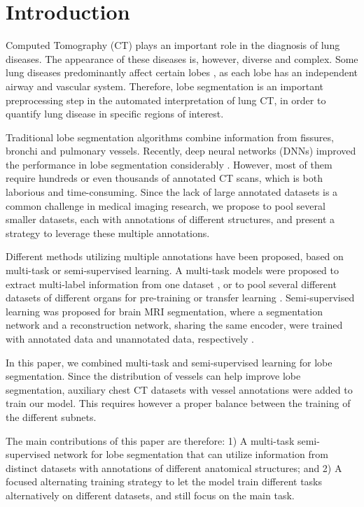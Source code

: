 \section{Introduction}
Computed Tomography (CT) plays an important role in the diagnosis of lung diseases. The appearance of these diseases is, however, diverse and complex. Some lung diseases predominantly affect certain lobes \cite{park2020fully}, as each lobe has an independent airway and vascular system. Therefore, lobe segmentation is an important preprocessing step in the automated interpretation of lung CT, in order to quantify lung disease in specific regions of interest.

Traditional lobe segmentation algorithms \cite{lassen2012automatic} combine information from fissures, bronchi and pulmonary vessels. Recently, deep neural networks (DNNs) improved the performance in lobe segmentation considerably \cite{gerard2018fissurenet, george2017pathological}. However, most of them require hundreds \cite{george2017pathological}or even thousands \cite{gerard2018fissurenet} of annotated CT scans, which is both laborious and time-consuming. Since the lack of large annotated datasets is a common challenge in medical imaging research, we propose to pool several smaller datasets, each with annotations of different structures, and present a strategy to leverage these multiple annotations.

Different methods utilizing multiple annotations have been proposed, based on multi-task or semi-supervised learning. A multi-task models were proposed to extract multi-label information from one dataset \cite{ferreira2018end}, or to pool several different datasets of different organs for pre-training or transfer learning \cite{chen2019med3d}. Semi-supervised learning was proposed for brain MRI segmentation, where a segmentation network and a reconstruction network, sharing the same encoder, were trained with annotated data and unannotated data, respectively \cite{chen2019multi}. 

In this paper, we combined multi-task and semi-supervised learning for lobe segmentation. Since the distribution of vessels can help improve lobe segmentation, auxiliary chest CT datasets with vessel annotations were added to train our model. This requires however a proper balance between the training of the different subnets.

The main contributions of this paper are therefore: 1) A multi-task semi-supervised network for lobe segmentation that can utilize information from distinct datasets with annotations of different anatomical structures; and 2) A focused alternating training strategy to let the model train different tasks alternatively on different datasets, and still focus on the main task.

